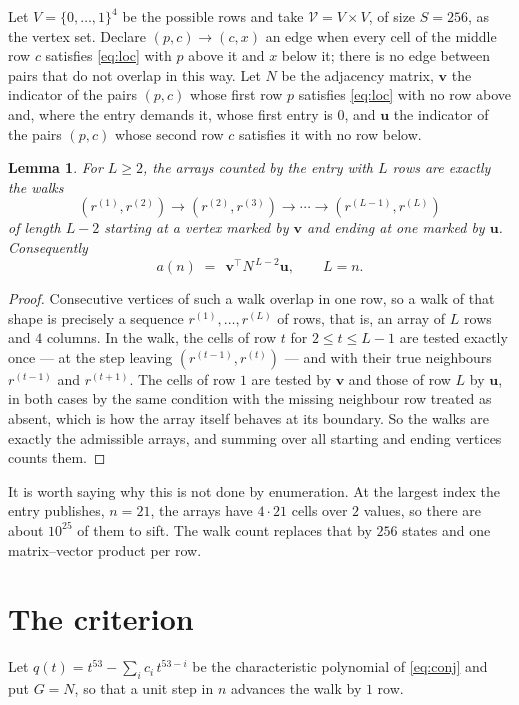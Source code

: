 \documentclass[11pt,a4paper]{article}
\theoremstyle{plain}
\newtheorem{lemma}[theorem]{Lemma}
\theoremstyle{definition}
\begin{document}
Let $V=\{0,\dots,1\}^{4}$ be the possible rows and take
$\mathcal V=V\times V$, of size $S=256$, as the vertex set. Declare $(p,c)\to(c,x)$ an edge
when every cell of the middle row $c$ satisfies \eqref{eq:loc} with $p$ above it and $x$
below it; there is no edge between pairs that do not overlap in this way. Let $N$ be the
adjacency matrix, $\mathbf{v}$ the indicator of the pairs $(p,c)$ whose first row $p$
satisfies \eqref{eq:loc} with no row above and, where the entry demands it, whose first entry is $0$, and $\mathbf{u}$ the indicator of
the pairs $(p,c)$ whose second row $c$ satisfies it with no row below.

\begin{lemma}\label{lem:walk}
For $L\ge2$, the arrays counted by the entry with $L$ rows are exactly the walks
\[
(r^{(1)},r^{(2)})\to(r^{(2)},r^{(3)})\to\cdots\to(r^{(L-1)},r^{(L)})
\]
of length $L-2$ starting at a vertex marked by $\mathbf{v}$ and ending at one marked by
$\mathbf{u}$. Consequently
\[
a(n)\;=\;\,\mathbf{v}^{\!\top}N^{\,L-2}\mathbf{u},\qquad L=n .
\]
\end{lemma}

\begin{proof}
Consecutive vertices of such a walk overlap in one row, so a walk of that shape is
precisely a sequence $r^{(1)},\dots,r^{(L)}$ of rows, that is, an array of $L$ rows
and $4$ columns. In the walk, the cells of row $t$ for $2\le t\le L-1$ are tested
exactly once --- at the step leaving $(r^{(t-1)},r^{(t)})$ --- and with their true
neighbours $r^{(t-1)}$ and $r^{(t+1)}$. The cells of row $1$ are tested by
$\mathbf{v}$ and those of row $L$ by $\mathbf{u}$, in both cases by the same condition
with the missing neighbour row treated as absent, which is how the array itself behaves at
its boundary. So the walks are exactly the admissible arrays, and summing over all starting
and ending vertices counts them.
\end{proof}


It is worth saying why this is not done by enumeration. At the largest index the entry
publishes, $n=21$, the arrays have $4\cdot21$ cells over
$2$ values, so there are about $10^{25}$ of them to sift. The
walk count replaces that by $256$ states and one matrix--vector product per row.
\section{The criterion}

Let $q(t)=t^{53}-\sum_i c_i\,t^{53-i}$ be the characteristic polynomial of
\eqref{eq:conj} and put $G=N$, so that a unit step in $n$ advances the walk by
$1$ row.
\end{document}

